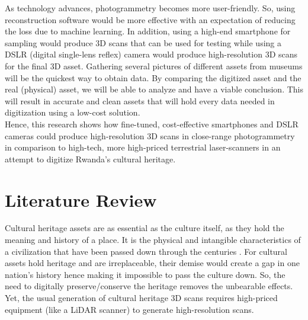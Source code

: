\documentclass[conference]{IEEEtran}
\begin{document}
As technology advances, photogrammetry becomes more user-friendly. So, using reconstruction software would be more effective with an expectation of reducing the loss due to machine learning. In addition, using a high-end smartphone for sampling would produce 3D scans that can be used for testing while using a DSLR (digital single-lens reflex) camera would produce high-resolution 3D scans for the final 3D asset. Gathering several pictures of different assets from museums will be the quickest way to obtain data. By comparing the digitized asset and the real (physical) asset, we will be able to analyze and have a viable conclusion. This will result in accurate and clean assets that will hold every data needed in digitization using a low-cost solution. \\


Hence, this research shows how fine-tuned, cost-effective smartphones and DSLR cameras could produce high-resolution 3D scans in close-range photogrammetry in comparison to high-tech, more high-priced terrestrial laser-scanners in an attempt to digitize Rwanda’s cultural heritage.

\section{\textbf{Literature Review}}

Cultural heritage assets are as essential as the culture itself, as they hold the meaning and history of a place. It is the physical and intangible characteristics of a civilization that have been passed down through the centuries \cite{WILLIS2014145}. For cultural assets hold heritage and are irreplaceable, their demise would create a gap in one nation’s history hence making it impossible to pass the culture down. So, the need to digitally preserve/conserve the heritage removes the unbearable effects. Yet, the usual generation of cultural heritage 3D scans requires high-priced equipment (like a LiDAR scanner) \cite{priced} to generate high-resolution scans. \\
\end{document}
